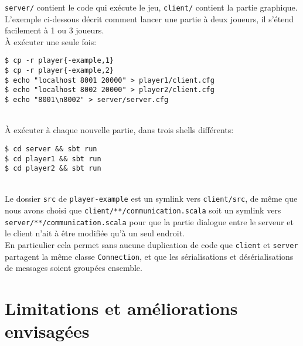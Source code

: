 \documentclass[a4paper,french]{article}
\newcommand{\ttt}[1]{\texttt{#1}}
\begin{document}
\ttt{server/} contient le code qui ex\'ecute le jeu, \ttt{client/} contient la partie graphique.\\

L'exemple ci-dessous d\'ecrit comment lancer une partie \`a deux joueurs, il s'\'etend facilement \`a 1 ou 3 joueurs.\\

\`A ex\'ecuter une seule fois:
\begin{lstlisting}
$ cp -r player{-example,1}
$ cp -r player{-example,2}
$ echo "localhost 8001 20000" > player1/client.cfg
$ echo "localhost 8002 20000" > player2/client.cfg
$ echo "8001\n8002" > server/server.cfg
\end{lstlisting}~\\


\`A ex\'ecuter \`a chaque nouvelle partie, dans trois shells diff\'erents:
\begin{lstlisting}
$ cd server && sbt run
$ cd player1 && sbt run
$ cd player2 && sbt run
\end{lstlisting}~\\

Le dossier \ttt{src} de \ttt{player-example} est un symlink vers \ttt{client/src}, de m\^eme que nous avons choisi
que \ttt{client/**/communication.scala} soit un symlink vers \ttt{server/**/communication.scala} pour que la partie
dialogue entre le serveur et le client n'ait \`a \^etre modifi\'ee qu'\`a un seul endroit.\\
En particulier cela permet sans aucune duplication de code que \ttt{client} et \ttt{server} partagent la m\^eme classe
\ttt{Connection}, et que les s\'erialisations et d\'es\'erialisations de messages soient group\'ees ensemble.


\section{Limitations et am\'eliorations envisag\'ees}
\end{document}
